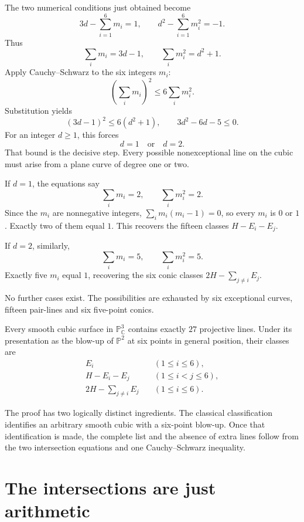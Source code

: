 The two numerical conditions just obtained become
\begin{equation}
 3d-\sum_{i=1}^6m_i=1,
 \qquad
 d^2-\sum_{i=1}^6m_i^2=-1.
 \label{eq:N20261109-diophantine}
\end{equation}
Thus
\[
 \sum_i m_i=3d-1,\qquad
 \sum_i m_i^2=d^2+1.
\]
Apply Cauchy--Schwarz to the six integers \(m_i\):
\[
 \left(\sum_i m_i\right)^2
 \leq6\sum_i m_i^2.
\]
Substitution yields
\[
 (3d-1)^2\leq6(d^2+1),
 \qquad
 3d^2-6d-5\leq0.
\]
For an integer \(d\geq1\), this forces
\[
 \boxed{d=1\quad\text{or}\quad d=2.}
\]
That bound is the decisive step. Every possible nonexceptional line on the cubic must arise from a plane curve of degree one or two.

If \(d=1\), the equations say
\[
 \sum_i m_i=2,\qquad\sum_i m_i^2=2.
\]
Since the \(m_i\) are nonnegative integers,
\(\sum_i m_i(m_i-1)=0\), so every \(m_i\) is \(0\) or \(1\). Exactly two of them equal \(1\). This recovers the fifteen classes \(H-E_i-E_j\).

If \(d=2\), similarly,
\[
 \sum_i m_i=5,\qquad\sum_i m_i^2=5.
\]
Exactly five \(m_i\) equal \(1\), recovering the six conic classes \(2H-\sum_{j\ne i}E_j\).

No further cases exist. The possibilities are exhausted by six exceptional curves, fifteen pair-lines and six five-point conics.

\begin{theorem}
Every smooth cubic surface in \(\mathbb P^3_{\mathbb C}\) contains exactly \(27\) projective lines. Under its presentation as the blow-up of \(\mathbb P^2\) at six points in general position, their classes are
\[
 \begin{aligned}
 E_i\quad&(1\leq i\leq6),\\
 H-E_i-E_j\quad&(1\leq i<j\leq6),\\
 2H-\sum_{j\ne i}E_j\quad&(1\leq i\leq6).
 \end{aligned}
\]
\end{theorem}

The proof has two logically distinct ingredients. The classical classification identifies an arbitrary smooth cubic with a six-point blow-up. Once that identification is made, the complete list and the absence of extra lines follow from the two intersection equations and one Cauchy--Schwarz inequality.

\section{The intersections are just arithmetic}

